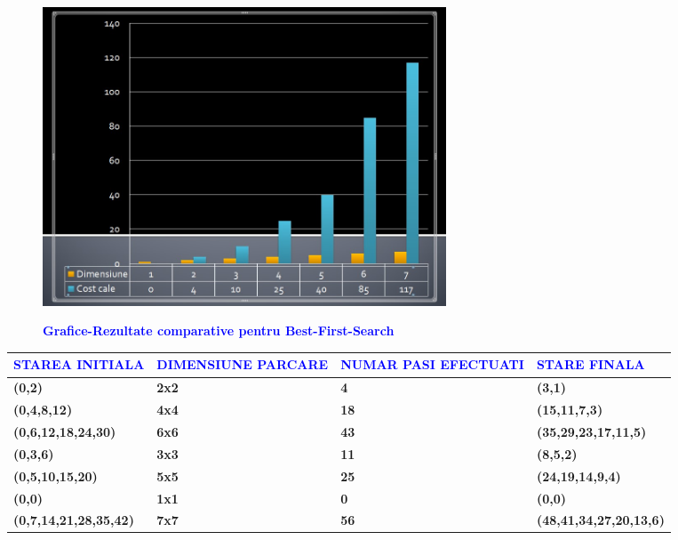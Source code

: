 \documentclass{article}
\begin{document}
\begin{flushleft}
\begin{flushleft}
\begin{figure}
        \includegraphics[width=12cm]{grafic_rezultate_bfs.jpg}
        \bfseries \caption{\textbf{\textcolor{blue}{Grafice-Rezultate comparative pentru Best-First-Search}}}
\end{figure}
\vspace{10mm}
\begin{center}
\begin{tabularx}{1\textwidth} { 
  | >{\raggedright\arraybackslash}X 
  | >{\centering\arraybackslash}X 
  | >{\centering\arraybackslash}X 
  | >{\raggedleft\arraybackslash}X  |}
\hline
\textcolor{blue}{\bfseries STAREA INITIALA } & \textcolor{blue}{\bfseries DIMENSIUNE PARCARE} & \textcolor{blue}{\bfseries NUMAR PASI EFECTUATI} & \textcolor{blue}{\bfseries STARE FINALA }\\
\hline
 \bfseries (0,2)  & \bfseries 2x2 & \bfseries 4  & \bfseries (3,1)  \\
\hline
 \bfseries (0,4,8,12) & \bfseries 4x4 & \bfseries 18 & \bfseries (15,11,7,3)\\
\hline
 \bfseries (0,6,12,18,24,30) & \bfseries 6x6 & \bfseries 43 & \bfseries (35,29,23,17,11,5)\\
\hline
 \bfseries (0,3,6) & \bfseries 3x3 & \bfseries 11 & \bfseries (8,5,2)\\
\hline
 \bfseries (0,5,10,15,20) & \bfseries 5x5 & \bfseries 25 & \bfseries (24,19,14,9,4)\\
\hline
 \bfseries (0,0) & \bfseries 1x1 & \bfseries 0 & \bfseries (0,0)\\
\hline
\bfseries (0,7,14,21,28,35,42) & \bfseries 7x7 & \bfseries 56 & \bfseries (48,41,34,27,20,13,6)\\
\hline 
\end{tabularx} 
\vspace{2mm}

\end{center}
\end{flushleft}
\end{flushleft}
\end{document}
